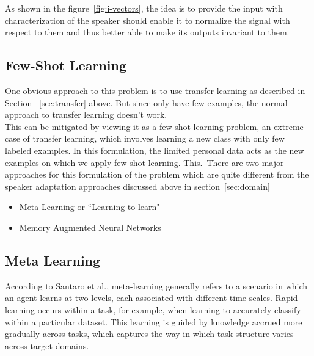As shown in the figure~\ref{fig:i-vectors}, the idea is to provide the input with characterization of the speaker should enable it to normalize the signal with respect to them and thus better able to make its outputs invariant to them.

\subsection{Few-Shot Learning}
\label{sec:few-shot}

One obvious approach to this problem is to use transfer learning as described in Section ~\ref{sec:transfer} above. But since only have few examples, the normal approach to transfer learning doesn't work.\\
This can be mitigated by viewing it as a few-shot learning problem, an extreme case of transfer learning, which involves learning a new class with only few labeled examples. In this formulation, the limited personal data acts as the new examples on which we apply few-shot learning. This.\
There are two major approaches for this formulation of the problem which are quite different from the speaker adaptation approaches discussed above in section~\ref{sec:domain}\:
\begin{itemize}
\setlength\itemsep{0.1em}
\item Meta Learning or ``Learning to learn"
\item Memory Augmented Neural Networks
\end{itemize}

\subsection{Meta Learning}

According to {Santaro et al.}\cite{DBLP:journals/corr/SantoroBBWL16}, meta-learning generally refers to a scenario in which an agent learns at two levels, each associated with different time scales. Rapid learning occurs within a task, for example, when learning to accurately classify within a particular dataset. This learning is guided by knowledge
accrued more gradually across tasks, which captures the way in which task structure varies across target domains.


